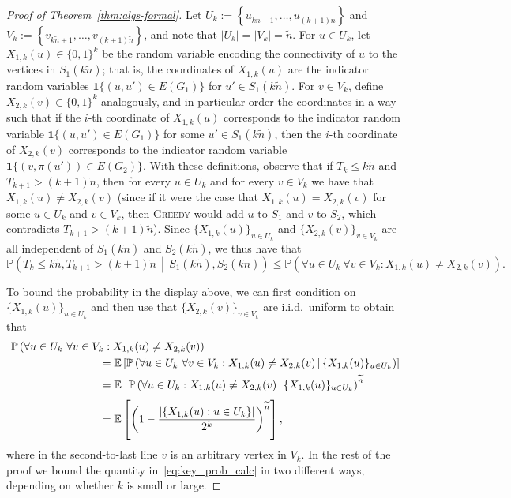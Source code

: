 \documentclass[10pt,a4paper]{amsart}
\newcommand{\E}{\mathbb{E}}
\renewcommand{\Pr}{\mathbb{P}}
\newcommand{\greedy}{\textsc{Greedy} }
\begin{document}
\begin{proof}[Proof of Theorem~\ref{thm:algs-formal}]
Let 
$U_{k} := \left\{ u_{k \widetilde{n}+1}, \ldots, u_{(k+1)\widetilde{n}} \right\}$ 
and 
$V_{k} := \left\{ v_{k \widetilde{n}+1}, \ldots, v_{(k+1)\widetilde{n}} \right\}$, 
and note that $|U_{k}| = |V_{k}| = \widetilde{n}$. 
For $u \in U_{k}$, 
let $X_{1,k}(u) \in \{0,1\}^{k}$ be the random variable encoding the connectivity of $u$ to the vertices in $S_{1}(k \widetilde{n})$; that is, the coordinates of $X_{1,k}(u)$ are the indicator random variables $\mathbf{1}{\{ (u,u') \in E(G_{1})\}}$ 
for $u' \in S_{1}(k \widetilde{n})$. 
For $v \in V_{k}$, 
define $X_{2,k}(v) \in \{0,1\}^{k}$ analogously, 
and in particular order the coordinates in a way such that 
if the $i$-th coordinate of $X_{1,k}(u)$ corresponds to the indicator random variable $\mathbf{1} {\{ (u,u') \in E(G_{1})\}}$ for some $u' \in S_{1}(k \widetilde{n})$, 
then the $i$-th coordinate of $X_{2,k}(v)$ corresponds to the indicator random variable $\mathbf{1} {\{ (v,\pi(u')) \in E(G_{2})\}}$. 
With these definitions, observe that 
if $T_{k} \leq k \widetilde{n}$ and $T_{k+1} > (k+1) \widetilde{n}$, 
then for every $u \in U_{k}$ and for every $v \in V_{k}$ 
we have that $X_{1,k}(u) \neq X_{2,k}(v)$ 
(since if it were the case that $X_{1,k}(u) = X_{2,k}(v)$ 
for some $u \in U_{k}$ and $v \in V_{k}$, 
then \greedy would add $u$ to $S_{1}$ and $v$ to $S_{2}$, 
which contradicts $T_{k+1} > (k+1) \widetilde{n}$). 
Since $\{ X_{1,k}(u) \}_{u \in U_{k}}$ and $\{ X_{2,k} (v) \}_{v \in V_{k}}$ are all independent of $S_{1}(k \widetilde{n})$ and $S_{2}(k \widetilde{n})$, we thus have that 
\begin{equation}\label{eq:block_gap}
\Pr \left( T_{k} \leq k \widetilde{n}, T_{k+1} > (k+1) \widetilde{n} \, \middle| \, S_{1}(k \widetilde{n}), S_{2}(k \widetilde{n}) \right) 
\leq 
\Pr \left( \forall u \in U_{k} \ \forall v \in V_{k} : X_{1,k}(u) \neq X_{2,k}(v) \right). 
\end{equation}

To bound the probability in the display above, we can first condition on $\{ X_{1,k}(u) \}_{u \in U_{k}}$ and then use that $\{ X_{2,k} (v) \}_{v \in V_{k}}$ are i.i.d.\ uniform to obtain that 
\begin{align}
&\Pr \left( \forall u \in U_{k} \ \forall v \in V_{k} : X_{1,k}(u) \neq X_{2,k}(v) \right) \notag \\
&\qquad \qquad \qquad \qquad = \E \left[ \Pr \left( \forall u \in U_{k} \ \forall v \in V_{k} : X_{1,k}(u) \neq X_{2,k}(v) \, \middle| \, \{ X_{1,k}(u) \}_{u \in U_{k}} \right) \right] \notag \\
&\qquad \qquad \qquad \qquad = \E \left[ \Pr \left( \forall u \in U_{k} : X_{1,k}(u) \neq X_{2,k}(v) \, \middle| \, \{ X_{1,k}(u) \}_{u \in U_{k}} \right)^{\widetilde{n}} \right] \notag \\
&\qquad \qquad \qquad \qquad = \E \left[ \left( 1 - \frac{\left| \left\{ X_{1,k}(u) : u \in U_{k} \right\} \right|}{2^{k}} \right)^{\widetilde{n}} \right], \label{eq:key_prob_calc}
\end{align}
where in the second-to-last line $v$ is an arbitrary vertex in $V_{k}$. 
In the rest of the proof we bound the quantity in~\eqref{eq:key_prob_calc} in two different ways, depending on whether $k$ is small or large. 


\end{proof}
\end{document}
